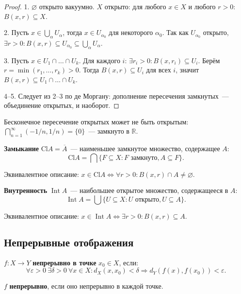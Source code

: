 \documentclass[12pt]{article}
\newcommand{\Cl}{\text{Cl}}
\begin{document}
	\begin{proof}
		1. $\varnothing$ открыто вакуумно. $X$ открыто: для любого $x \in X$ и любого $r > 0$: $B(x, r) \subseteq X$.
		
		2. Пусть $x \in \bigcup_\alpha U_\alpha$, тогда $x \in U_{\alpha_0}$ для некоторого $\alpha_0$. Так как $U_{\alpha_0}$ открыто, $\exists r > 0: B(x, r) \subseteq U_{\alpha_0} \subseteq \bigcup_\alpha U_\alpha$.
		
		3. Пусть $x \in U_1 \cap \dots \cap U_k$. Для каждого $i$: $\exists r_i > 0: B(x, r_i) \subseteq U_i$. Берём $r = \min(r_1, \dots, r_k) > 0$. Тогда $B(x, r) \subseteq U_i$ для всех $i$, значит $B(x, r) \subseteq U_1 \cap \dots \cap U_k$.
		
		4--5. Следует из 2--3 по де Моргану: дополнение пересечения замкнутых~--- объединение открытых, и наоборот.
	\end{proof}
	
	\begin{note}
		Бесконечное пересечение открытых может не быть открытым: $\bigcap_{n=1}^\infty (-1/n, 1/n) = \{0\}$~--- замкнуто в $\mathbb{R}$.
	\end{note}
	
	\begin{definition}
		\textbf{Замыкание} $\Cl A = \overline{A}$~--- наименьшее замкнутое множество, содержащее $A$:
		\[\Cl A = \bigcap \{F \subseteq X : F \text{ замкнуто}, A \subseteq F\}.\]
		
		Эквивалентное описание: $x \in \Cl A \Leftrightarrow \forall r > 0: B(x, r) \cap A \neq \varnothing$.
	\end{definition}
	
	\begin{definition}
		\textbf{Внутренность} $\operatorname{Int} A$~--- наибольшее открытое множество, содержащееся в $A$:
		\[\operatorname{Int} A = \bigcup \{U \subseteq X : U \text{ открыто}, U \subseteq A\}.\]
		
		Эквивалентное описание: $x \in \operatorname{Int} A \Leftrightarrow \exists r > 0: B(x, r) \subseteq A$.
	\end{definition}
	
	\subsection{Непрерывные отображения}
	
	\begin{definition}
		$f: X \to Y$ \textbf{непрерывно в точке} $x_0 \in X$, если:
		\[\forall \varepsilon > 0 \ \exists \delta > 0 \ \forall x \in X: d_X(x, x_0) < \delta \Rightarrow d_Y(f(x), f(x_0)) < \varepsilon.\]
		
		$f$ \textbf{непрерывно}, если оно непрерывно в каждой точке.
	\end{definition}
	
\end{document}
